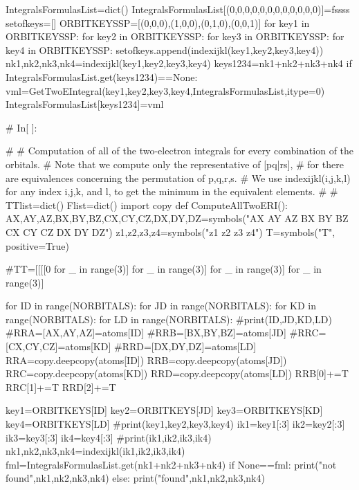 IntegralsFormulasList=dict()
IntegralsFormulasList[(0,0,0,0,0,0,0,0,0,0,0,0)]=fssss
setofkeys=[]
ORBITKEYSSP=[(0,0,0),(1,0,0),(0,1,0),(0,0,1)]
for key1 in ORBITKEYSSP:
    for key2 in ORBITKEYSSP:
        for key3 in ORBITKEYSSP:
            for key4 in ORBITKEYSSP:
                setofkeys.append(indexijkl(key1,key2,key3,key4))
                nk1,nk2,nk3,nk4=indexijkl(key1,key2,key3,key4)
                keys1234=nk1+nk2+nk3+nk4
                if IntegralsFormulasList.get(keys1234)==None:
                    vml=GetTwoEIntegral(key1,key2,key3,key4,IntegralsFormulasList,itype=0)
                    IntegralsFormulasList[keys1234]=vml
 

   
                    
                    
                


# In[ ]:


#
#  Computation of all of the two-electron integrals for every combination of the orbitals.
#  Note that we compute only the representative of [pq|rs], 
#    for there are equivalences concerning the permutation of p,q,r,s.
#    We use indexijkl(i,j,k,l) for any index i,j,k, and l, to get the minimum in the equivalent elements. 
#
#
TTlist=dict()
Flist=dict()
import copy
def ComputeAllTwoERI():
    AX,AY,AZ,BX,BY,BZ,CX,CY,CZ,DX,DY,DZ=symbols("AX AY AZ BX BY BZ CX CY CZ DX DY DZ")
    z1,z2,z3,z4=symbols("z1 z2 z3 z4")
    T=symbols("T", positive=True)

    #TT=[[[[0 for _ in range(3)] for _  in range(3)] for _ in range(3)] for _ in range(3)]
    
    for ID in range(NORBITALS):
        for JD in range(NORBITALS):
            for KD in range(NORBITALS):
                for LD in range(NORBITALS):
                    #print(ID,JD,KD,LD)
                    #RRA=[AX,AY,AZ]=atoms[ID]
                    #RRB=[BX,BY,BZ]=atoms[JD]
                    #RRC=[CX,CY,CZ]=atoms[KD]
                    #RRD=[DX,DY,DZ]=atoms[LD]
                    RRA=copy.deepcopy(atoms[ID])
                    RRB=copy.deepcopy(atoms[JD])
                    RRC=copy.deepcopy(atoms[KD])
                    RRD=copy.deepcopy(atoms[LD])
                    RRB[0]+=T
                    RRC[1]+=T
                    RRD[2]+=T

                    key1=ORBITKEYS[ID]
                    key2=ORBITKEYS[JD]
                    key3=ORBITKEYS[KD]
                    key4=ORBITKEYS[LD]
                    #print(key1,key2,key3,key4)
                    ik1=key1[:3]
                    ik2=key2[:3]
                    ik3=key3[:3]
                    ik4=key4[:3]
                    #print(ik1,ik2,ik3,ik4)
                    nk1,nk2,nk3,nk4=indexijkl(ik1,ik2,ik3,ik4)
                    fml=IntegralsFormulasList.get(nk1+nk2+nk3+nk4)
                    if None==fml:
                        print("\nFormula not found",nk1,nk2,nk3,nk4)
                    else:
                        print("\nFormula found",nk1,nk2,nk3,nk4)
                        

